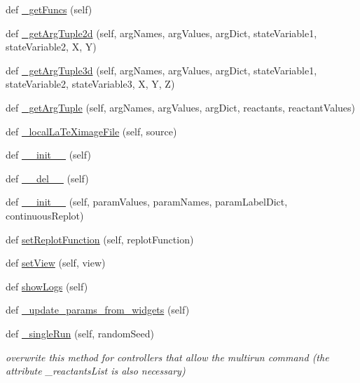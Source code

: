 \begin{DoxyCompactItemize}
\item 
def \hyperlink{namespace_mu_mo_t_a20845a319b4faca69e7803e37456d0c2}{\+\_\+get\+Funcs} (self)
\item 
def \hyperlink{namespace_mu_mo_t_af47c777c700a31a1ea798df5644cf286}{\+\_\+get\+Arg\+Tuple2d} (self, arg\+Names, arg\+Values, arg\+Dict, state\+Variable1, state\+Variable2, X, Y)
\item 
def \hyperlink{namespace_mu_mo_t_a7170940a9b39956495d308a48f4ff7fd}{\+\_\+get\+Arg\+Tuple3d} (self, arg\+Names, arg\+Values, arg\+Dict, state\+Variable1, state\+Variable2, state\+Variable3, X, Y, Z)
\item 
def \hyperlink{namespace_mu_mo_t_a7500e50d488ac8e7ab45120ad3ad3566}{\+\_\+get\+Arg\+Tuple} (self, arg\+Names, arg\+Values, arg\+Dict, reactants, reactant\+Values)
\item 
def \hyperlink{namespace_mu_mo_t_afafbe2f0b5f286e1bbe2d707b00e692e}{\+\_\+local\+La\+Te\+Ximage\+File} (self, source)
\item 
def \hyperlink{namespace_mu_mo_t_ae64f0875afe3067b97ba370b354b9213}{\+\_\+\+\_\+init\+\_\+\+\_\+} (self)
\item 
def \hyperlink{namespace_mu_mo_t_a1249cdf9ce390fbd69d863d4bff76be4}{\+\_\+\+\_\+del\+\_\+\+\_\+} (self)
\item 
def \hyperlink{namespace_mu_mo_t_a73251532d0348adaeafe8a178cfc6a73}{\+\_\+\+\_\+init\+\_\+\+\_\+} (self, param\+Values, param\+Names, param\+Label\+Dict, continuous\+Replot)
\item 
def \hyperlink{namespace_mu_mo_t_a74fe87995d70867d5327558b573a7663}{set\+Replot\+Function} (self, replot\+Function)
\item 
def \hyperlink{namespace_mu_mo_t_a5581723fe21a31b8c96cd4ed5e801b97}{set\+View} (self, view)
\item 
def \hyperlink{namespace_mu_mo_t_aca4d648d909f4722c7e07197675500bb}{show\+Logs} (self)
\item 
def \hyperlink{namespace_mu_mo_t_add4eacb8e812feeca1d4b2538e3bd6e0}{\+\_\+update\+\_\+params\+\_\+from\+\_\+widgets} (self)
\item 
def \hyperlink{namespace_mu_mo_t_a51d421aacb4cd83af5f1c2e60c3dff9c}{\+\_\+single\+Run} (self, random\+Seed)
\begin{DoxyCompactList}\small\item\em overwrite this method for controllers that allow the \textquotesingle{}multirun\textquotesingle{} command (the attribute \+\_\+reactants\+List is also necessary) \end{DoxyCompactList}\item 

\end{DoxyCompactItemize}
